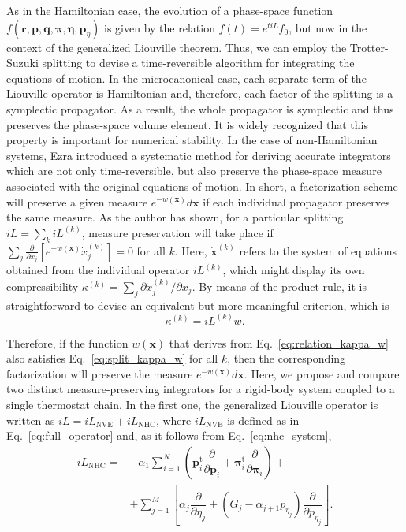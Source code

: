 \documentclass[aip,jcp,reprint,amsmath,amssymb]{revtex4-1}
\newcommand{\vt}[1]{\boldsymbol{\mathbf{#1}}}           %
\newcommand{\tr}[1]{#1^\text{t}}                        %
\newcommand{\diff}[2]{\dfrac{\partial #1}{\partial #2}} %
\begin{document}
As in the Hamiltonian case, the evolution of a phase-space function $f(\vt r, \vt p, \vt q, \vt \pi, \vt \eta,{\vt p}_\eta)$ is given by the relation $f(t) = e^{t i\!L}f_0$, but now in the context of the generalized Liouville theorem.\cite{Tuckerman_1999, Tuckerman2001} Thus, we can employ the Trotter-Suzuki splitting to devise a time-reversible algorithm for integrating the equations of motion. In the microcanonical case, each separate term of the Liouville operator is Hamiltonian and, therefore, each factor of the splitting is a symplectic propagator. As a result, the whole propagator is symplectic and thus preserves the phase-space volume element. It is widely recognized that this property is important for numerical stability.\cite{Skeel1997} In the case of non-Hamiltonian systems, Ezra\cite{Ezra2006} introduced a systematic method for deriving accurate integrators which are not only time-reversible, but also preserve the phase-space measure associated with the original equations of motion. In short, a factorization scheme will preserve a given measure $e^{-w(\vt x)}d\vt x$ if each individual propagator preserves the same measure. As the author has shown,\cite{Ezra2006} for a particular splitting $i\!L = \sum_k i\!L^{(k)}$, measure preservation will take place if $\sum_j \tfrac{\partial}{\partial x_j} [e^{-w(\vt x)}\dot{x}_j^{(k)}] = 0$ for all $k$. Here, $\dot{\vt x}^{(k)}$ refers to the system of equations obtained from the individual operator $i\!L^{(k)}$, which might display its own compressibility $\kappa^{(k)} = \sum_j \partial \dot{x}_j^{(k)}/\partial x_j$. By means of the product rule, it is straightforward to devise an equivalent but more meaningful criterion, which is
\begin{equation}
\label{eq:split_kappa_w}
\kappa^{(k)} = i\!L^{(k)} w.
\end{equation}

Therefore, if the function $w(\vt x)$ that derives from Eq.~\eqref{eq:relation_kappa_w} also satisfies Eq.~\eqref{eq:split_kappa_w} for all $k$, then the corresponding factorization will preserve the measure $e^{-w(\vt x)}d\vt x$. Here, we propose and compare two distinct measure-preserving integrators for a rigid-body system coupled to a single thermostat chain. In the first one, the generalized Liouville operator is written as $i\!L = i\!L_\text{NVE} + i\!L_\text{NHC}$, where $i\!L_\text{NVE}$ is defined as in Eq.~\eqref{eq:full_operator} and, as it follows from Eq.~\eqref{eq:nhc_system},
\begin{equation}
\label{eq:iL_NHC}
\begin{split}
i\!L_\text{NHC} = &-\alpha_1 \sum_{i=1}^N \left( \tr{\vt p}_i \diff{}{\vt p_i} + \tr{\vt \pi}_i \diff{}{\vt \pi_i}\right) + \\
&+ \sum_{j=1}^{M} \left[\alpha_j \diff{}{\eta_j} + (G_j - \alpha_{j+1} p_{\eta_j}) \diff{}{p_{\eta_j}}\right].
\end{split}
\end{equation}
\end{document}
